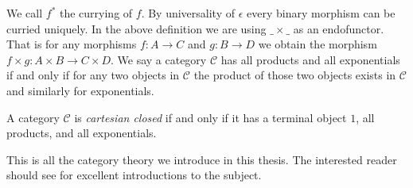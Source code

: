 We call ${f}^*$ the currying of $f$.  By universality of $\epsilon$
every binary morphism can be curried uniquely.  In the above
definition we are using $\_ \times \_$ as an endofunctor.  That is for
any morphisms $f : A \to C$ and $g : B \to D$ we obtain the morphism
$f \times g : A \times B \to C \times D$.  We say a category
$\mathcal{C}$ has all products and all exponentials if and only if for
any two objects in $\mathcal{C}$ the product of those two objects
exists in $\mathcal{C}$ and similarly for exponentials.
\begin{definition}
  \label{def:cartesian}
  A category $\mathcal{C}$ is \emph{cartesian closed} if and only if it has a terminal object $1$, all
  products, and all exponentials.
\end{definition}
\noindent
This is all the category theory we introduce in this thesis.  The
interested reader should
see \cite{Crole:1994,Gunter:1992,Lawvere:2009,Pierce:1991} for
excellent introductions to the subject.

